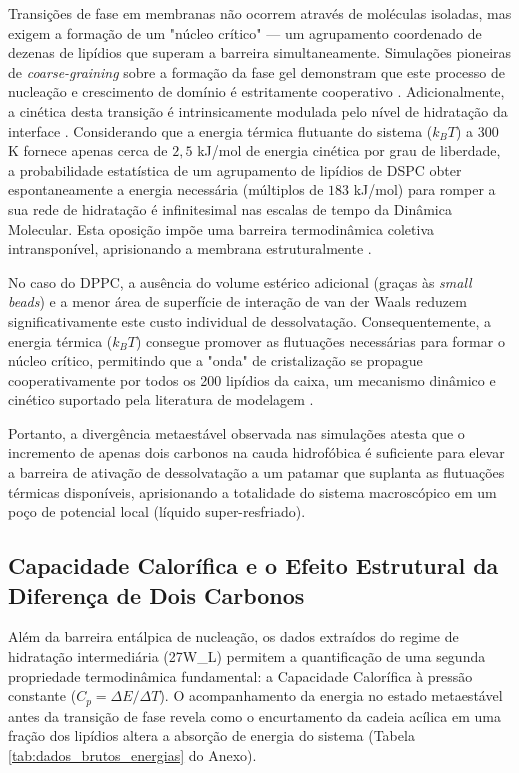 \documentclass[12pt]{article} %
\begin{document}
Transições de fase em membranas não ocorrem através de moléculas isoladas, mas exigem a formação de um "núcleo crítico" --- um agrupamento coordenado de dezenas de lipídios que superam a barreira simultaneamente. Simulações pioneiras de \textit{coarse-graining} sobre a formação da fase gel demonstram que este processo de nucleação e crescimento de domínio é estritamente cooperativo \cite{marrink2005}. Adicionalmente, a cinética desta transição é intrinsicamente modulada pelo nível de hidratação da interface \cite{kowalik2015}. Considerando que a energia térmica flutuante do sistema ($k_B T$) a 300 K fornece apenas cerca de $2,5$ kJ/mol de energia cinética por grau de liberdade, a probabilidade estatística de um agrupamento de lipídios de DSPC obter espontaneamente a energia necessária (múltiplos de $183$ kJ/mol) para romper a sua rede de hidratação é infinitesimal nas escalas de tempo da Dinâmica Molecular. Esta oposição impõe uma barreira termodinâmica coletiva intransponível, aprisionando a membrana estruturalmente \cite{raudino2011}.

No caso do DPPC, a ausência do volume estérico adicional (graças às \textit{small beads}) e a menor área de superfície de interação de van der Waals reduzem significativamente este custo individual de dessolvatação. Consequentemente, a energia térmica ($k_B T$) consegue promover as flutuações necessárias para formar o núcleo crítico, permitindo que a "onda" de cristalização se propague cooperativamente por todos os 200 lipídios da caixa, um mecanismo dinâmico e cinético suportado pela literatura de modelagem \cite{marrink2005, kowalik2015}. 

Portanto, a divergência metaestável observada nas simulações atesta que o incremento de apenas dois carbonos na cauda hidrofóbica é suficiente para elevar a barreira de ativação de dessolvatação a um patamar que suplanta as flutuações térmicas disponíveis, aprisionando a totalidade do sistema macroscópico em um poço de potencial local (líquido super-resfriado).


\subsection{Capacidade Calorífica e o Efeito Estrutural da Diferença de Dois Carbonos}

Além da barreira entálpica de nucleação, os dados extraídos do regime de hidratação intermediária (27W\_L) permitem a quantificação de uma segunda propriedade termodinâmica fundamental: a Capacidade Calorífica à pressão constante ($C_p = \Delta E / \Delta T$). O acompanhamento da energia no estado metaestável antes da transição de fase revela como o encurtamento da cadeia acílica em uma fração dos lipídios altera a absorção de energia do sistema (Tabela \ref{tab:dados_brutos_energias} do Anexo).
\end{document}
